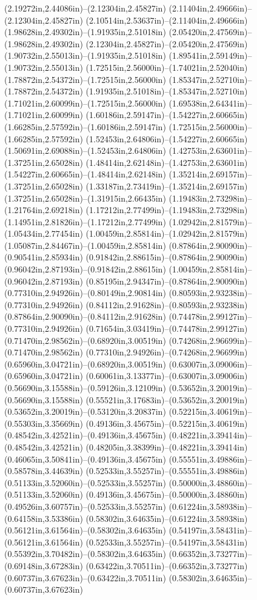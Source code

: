(2.19272in,2.44086in)--(2.12304in,2.45827in) (2.11404in,2.49666in)--(2.12304in,2.45827in) (2.10514in,2.53637in)--(2.11404in,2.49666in) (1.98628in,2.49302in)--(1.91935in,2.51018in) (2.05420in,2.47569in)--(1.98628in,2.49302in) (2.12304in,2.45827in)--(2.05420in,2.47569in) (1.90732in,2.55013in)--(1.91935in,2.51018in) (1.89541in,2.59149in)--(1.90732in,2.55013in) (1.72515in,2.56000in)--(1.74021in,2.52040in) (1.78872in,2.54372in)--(1.72515in,2.56000in) (1.85347in,2.52710in)--(1.78872in,2.54372in) (1.91935in,2.51018in)--(1.85347in,2.52710in) (1.71021in,2.60099in)--(1.72515in,2.56000in) (1.69538in,2.64341in)--(1.71021in,2.60099in) (1.60186in,2.59147in)--(1.54227in,2.60665in) (1.66285in,2.57592in)--(1.60186in,2.59147in) (1.72515in,2.56000in)--(1.66285in,2.57592in) (1.52453in,2.64806in)--(1.54227in,2.60665in) (1.50691in,2.69088in)--(1.52453in,2.64806in) (1.42753in,2.63601in)--(1.37251in,2.65028in) (1.48414in,2.62148in)--(1.42753in,2.63601in) (1.54227in,2.60665in)--(1.48414in,2.62148in) (1.35214in,2.69157in)--(1.37251in,2.65028in) (1.33187in,2.73419in)--(1.35214in,2.69157in) (1.37251in,2.65028in)--(1.31915in,2.66435in) (1.19483in,2.73298in)--(1.21764in,2.69218in) (1.17212in,2.77499in)--(1.19483in,2.73298in) (1.14951in,2.81826in)--(1.17212in,2.77499in) (1.02942in,2.81579in)--(1.05434in,2.77454in) (1.00459in,2.85814in)--(1.02942in,2.81579in) (1.05087in,2.84467in)--(1.00459in,2.85814in) (0.87864in,2.90090in)--(0.90541in,2.85934in) (0.91842in,2.88615in)--(0.87864in,2.90090in) (0.96042in,2.87193in)--(0.91842in,2.88615in) (1.00459in,2.85814in)--(0.96042in,2.87193in) (0.85195in,2.94347in)--(0.87864in,2.90090in) (0.77310in,2.94926in)--(0.80149in,2.90814in) (0.80593in,2.93238in)--(0.77310in,2.94926in) (0.84112in,2.91628in)--(0.80593in,2.93238in) (0.87864in,2.90090in)--(0.84112in,2.91628in) (0.74478in,2.99127in)--(0.77310in,2.94926in) (0.71654in,3.03419in)--(0.74478in,2.99127in) (0.71470in,2.98562in)--(0.68920in,3.00519in) (0.74268in,2.96699in)--(0.71470in,2.98562in) (0.77310in,2.94926in)--(0.74268in,2.96699in) (0.65960in,3.04721in)--(0.68920in,3.00519in) (0.63007in,3.09006in)--(0.65960in,3.04721in) (0.60061in,3.13377in)--(0.63007in,3.09006in) (0.56690in,3.15588in)--(0.59126in,3.12109in) (0.53652in,3.20019in)--(0.56690in,3.15588in) (0.55521in,3.17683in)--(0.53652in,3.20019in) (0.53652in,3.20019in)--(0.53120in,3.20837in) (0.52215in,3.40619in)--(0.55303in,3.35669in) (0.49136in,3.45675in)--(0.52215in,3.40619in) (0.48542in,3.42521in)--(0.49136in,3.45675in) (0.48221in,3.39414in)--(0.48542in,3.42521in) (0.48205in,3.38399in)--(0.48221in,3.39414in) (0.46065in,3.50841in)--(0.49136in,3.45675in) (0.55551in,3.49886in)--(0.58578in,3.44639in) (0.52533in,3.55257in)--(0.55551in,3.49886in) (0.51133in,3.52060in)--(0.52533in,3.55257in) (0.50000in,3.48860in)--(0.51133in,3.52060in) (0.49136in,3.45675in)--(0.50000in,3.48860in) (0.49526in,3.60757in)--(0.52533in,3.55257in) (0.61224in,3.58938in)--(0.64158in,3.53386in) (0.58302in,3.64635in)--(0.61224in,3.58938in) (0.56121in,3.61564in)--(0.58302in,3.64635in) (0.54197in,3.58431in)--(0.56121in,3.61564in) (0.52533in,3.55257in)--(0.54197in,3.58431in) (0.55392in,3.70482in)--(0.58302in,3.64635in) (0.66352in,3.73277in)--(0.69148in,3.67283in) (0.63422in,3.70511in)--(0.66352in,3.73277in) (0.60737in,3.67623in)--(0.63422in,3.70511in) (0.58302in,3.64635in)--(0.60737in,3.67623in) 